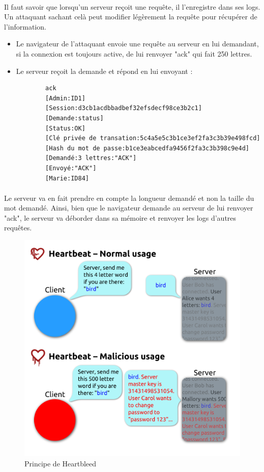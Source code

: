 \paragraph{}
Il faut savoir que lorsqu'un serveur reçoit une requête, il l'enregistre dans ses logs. Un attaquant sachant celà peut modifier légèrement la requête pour récupérer de l'information.
\begin{itemize}
  \item Le navigateur de l'attaquant envoie une requête au serveur en lui demandant, si la connexion est toujours active, de lui renvoyer "ack" qui fait 250 lettres.
  \item Le serveur reçoit la demande et répond en lui envoyant :
	\begin{verbatim}
		ack
		[Admin:ID1]
		[Session:d3cb1acdbbadbef32efsdecf98ce3b2c1]
		[Demande:status]
		[Status:OK]
		[Clé privée de transation:5c4a5e5c3b1ce3ef2fa3c3b39e498fcd]
		[Hash du mot de passe:b1ce3eabcedfa9456f2fa3c3b398c9e4d]
		[Demandé:3 lettres:"ACK"]
		[Envoyé:"ACK"]
		[Marie:ID84]
	\end{verbatim}
\end{itemize}

\paragraph{}
Le serveur va en fait prendre en compte la longueur demandé et non la taille du mot demandé. Ainsi, bien que le navigateur demande au serveur de lui renvoyer "ack", le serveur va déborder dans sa mémoire et renvoyer les logs d'autres requêtes.\\

\begin{figure}[h]
\label{fig:Principe de Heartbleed}
\centering
\includegraphics[scale=0.2]{Heartbleed}
\caption{Principe de Heartbleed}
\end{figure}


